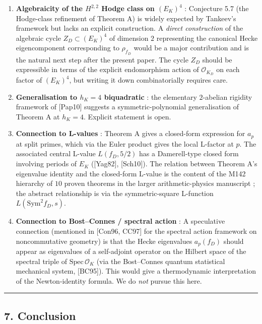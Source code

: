 \documentclass[
  11pt,
  a4paper,
]{amsart}
\begin{document}
\begin{enumerate}
\def\labelenumi{(\alph{enumi})}
\item
  \textbf{Algebraicity of the \(H^{2, 2}\) Hodge class on \((E_K)^4\)} : Conjecture 5.7 (the Hodge-class refinement of Theorem A) is widely expected by Tankeev's framework but lacks an explicit construction. A \emph{direct construction} of the algebraic cycle \(Z_D \subset (E_K)^4\) of dimension \(2\) representing the canonical Hecke eigencomponent corresponding to \(\rho_{f_D}\) would be a major contribution and is the natural next step after the present paper. The cycle \(Z_D\) should be expressible in terms of the explicit endomorphism action of \(\mathcal{O}_{K_D}\) on each factor of \((E_K)^4\), but writing it down combinatorially requires care.
\item
  \textbf{Generalisation to \(h_K = 4\) biquadratic} : the elementary \(2\)-abelian rigidity framework of {[}Pap10{]} suggests a symmetric-polynomial generalisation of Theorem A at \(h_K = 4\). Explicit statement is open.
\item
  \textbf{Connection to L-values} : Theorem A gives a closed-form expression for \(a_p\) at split primes, which via the Euler product gives the local L-factor at \(p\). The associated central L-value \(L(f_D, 5/2)\) has a Damerell-type closed form involving periods of \(E_K\) ({[}Yag82{]}, {[}Sch10{]}). The relation between Theorem A's eigenvalue identity and the closed-form L-value is the content of the M142 hierarchy of \(10\) proven theorems in the larger arithmetic-physics manuscript ; the abstract relationship is via the symmetric-square L-function \(L(\mathrm{Sym}^2 f_D, s)\).
\item
  \textbf{Connection to Bost--Connes / spectral action} : A speculative connection (mentioned in {[}Con96, CC97{]} for the spectral action framework on noncommutative geometry) is that the Hecke eigenvalues \(a_p(f_D)\) should appear as eigenvalues of a self-adjoint operator on the Hilbert space of the spectral triple of \(\mathrm{Spec}\,\mathcal{O}_K\) (via the Bost--Connes quantum statistical mechanical system, {[}BC95{]}). This would give a thermodynamic interpretation of the Newton-identity formula. We do \emph{not} pursue this here.
\end{enumerate}

\begin{center}\rule{0.5\linewidth}{0.5pt}\end{center}

\hypertarget{conclusion}{%
\subsection{7. Conclusion}\label{conclusion}}
\end{document}
